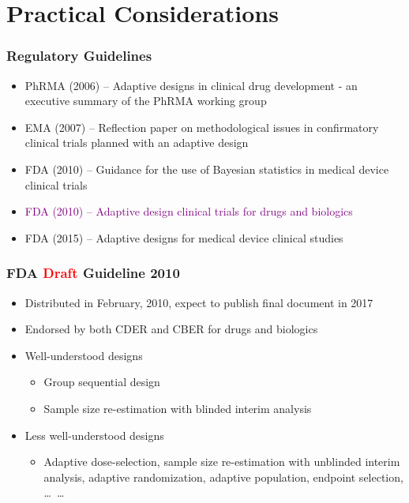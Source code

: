 \documentclass{beamer}
\begin{document}
\section{Practical Considerations}
\begin{frame}
	\frametitle{Regulatory Guidelines}
	\begin{itemize}  
		\item PhRMA (2006) -- Adaptive designs in clinical drug development - an executive summary of the PhRMA working group
		\item EMA (2007) -- Reflection paper on methodological issues in confirmatory clinical trials planned with an adaptive design
		\item FDA (2010) -- Guidance for the use of Bayesian statistics in medical device clinical trials
		\item \textcolor{purple}{FDA (2010) -- Adaptive design clinical trials for drugs and biologics} 
		\item FDA (2015) -- Adaptive designs for medical device clinical studies
	\end{itemize}  
	
\end{frame}

\begin{frame}
	\frametitle{FDA \textcolor{red}{Draft} Guideline 2010}
	\begin{itemize}  
		\item Distributed in February, 2010, expect to publish final document in 2017
		\item Endorsed by both CDER and CBER for drugs and biologics
		\item Well-understood designs \begin{itemize}
			\item Group sequential design
			\item Sample size re-estimation with blinded interim analysis
		\end{itemize}
		\item Less well-understood designs \begin{itemize}
			\item Adaptive dose-selection, sample size re-estimation with unblinded interim analysis, adaptive randomization, adaptive population, endpoint selection, \ldots\ \ldots
		\end{itemize}
	\end{itemize} 	
\end{frame}
\end{document}
